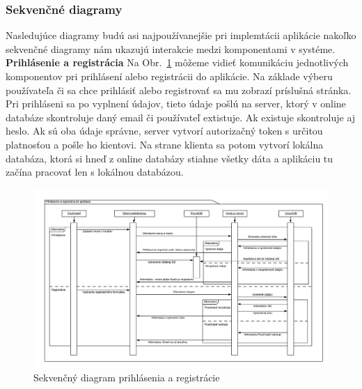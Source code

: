 \subsubsection{Sekvenčné diagramy}
\indent Nasledujúce diagramy budú asi najpoužívanejšie pri implemtácii aplikácie nakoľko sekvenčné diagramy nám ukazujú interakcie medzi komponentami v systéme.
\newline
\newline
\textbf{Prihlásenie a registrácia} \newline
\indent Na Obr.~\ref{fig:seq_login} môžeme vidieť komunikáciu jednotlivých komponentov pri prihlásení alebo registrácii do aplikácie. Na základe výberu používateľa či sa chce prihlásiť alebo registrovať sa mu zobrazí príslušná stránka. Pri prihláseni sa po vyplnení údajov, tieto údaje pošlú na server, ktorý v online databáze skontroluje daný email či používateľ extistuje. Ak existuje skontroluje aj heslo. Ak sú oba údaje správne, server vytvorí autorizačný token s určitou platnosťou a pošle ho kientovi. Na strane klienta sa potom vytvorí lokálna databáza, ktorá si hneď z online databázy stiahne všetky dáta a aplikáciu tu začína pracovať len s lokálnou databázou. 

\begin{figure}[H]
    \centering
    \includegraphics[scale=0.50]{img/Seq_login_register.png}
    \caption{Sekvenčný diagram prihlásenia a registrácie}
    \label{fig:seq_login}
\end{figure}

